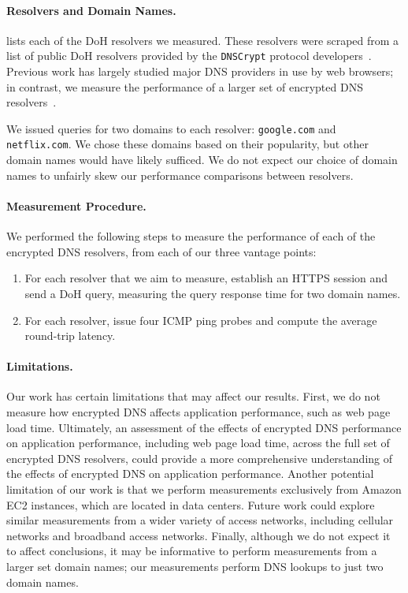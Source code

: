\paragraph{Resolvers and Domain Names.}  lists each of 
the DoH resolvers we measured.  These resolvers were
scraped from a list of public DoH resolvers provided by the \texttt{DNSCrypt}
protocol developers~\cite{dnscrypt-public-resolvers}.  Previous work has
largely studied major DNS providers in use by web browsers; in contrast, we
measure the performance of a larger set of encrypted DNS resolvers~\cite{hounsel2020comparing,hounsel2021can,hoang2020k,lu2019end-to-end}.

We issued queries for two domains to each resolver: \texttt{google.com} and
\texttt{netflix.com}.  We chose these domains based on their popularity, but
other domain names would have likely sufficed.  We do not expect our choice of
domain names to unfairly skew our performance comparisons between resolvers.

\paragraph{Measurement Procedure.} We performed the following steps to measure
the performance of each of the encrypted DNS resolvers, from each of our three vantage points:
\begin{enumerate} 
        \item For each
            resolver that we aim to measure, establish an HTTPS session and
            send a DoH query, measuring the query response time for two
            domain names.
    \item For each resolver, issue four ICMP ping
            probes and compute the average round-trip latency. 
\end{enumerate}

\paragraph{Limitations.} Our work has certain limitations that may affect our
results.  First, we do not measure how encrypted DNS affects application
performance, such as web page load time. Ultimately, an assessment of the
effects of encrypted DNS performance on application performance, including web
page load time, across the full set of encrypted DNS resolvers, could provide
a more comprehensive understanding of the effects of encrypted DNS on
application performance.  Another potential limitation of our work is that we
perform measurements exclusively from Amazon EC2 instances, which are located
in data centers. Future work could explore similar measurements from a wider
variety of access networks, including cellular networks and broadband access
networks.  Finally, although we do not expect it to affect conclusions, it may
be informative to perform measurements from a larger set domain names; our
measurements perform DNS lookups to just two domain names.
